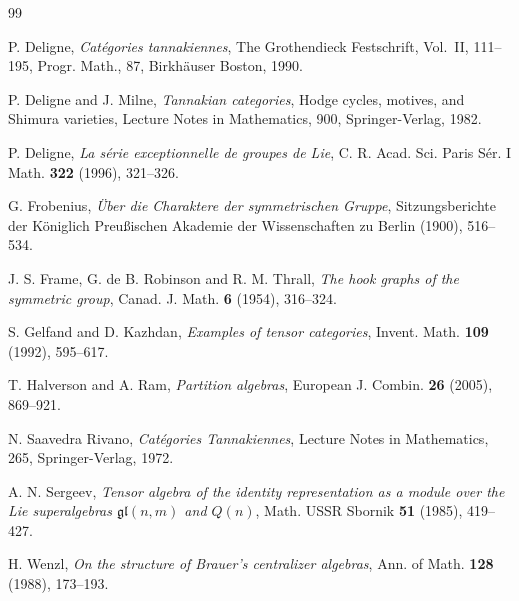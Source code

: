 \documentclass[11pt,a4paper]{article}
\theoremstyle{plain}
\theoremstyle{definition}
\begin{document}
\begin{thebibliography}{99}

P. Deligne, \textit{Cat\'egories tannakiennes}, The Grothendieck Festschrift, Vol.~II, 111--195, Progr. Math., 87, Birkh{\"a}user Boston, 1990.

P. Deligne and J. Milne, \textit{Tannakian categories}, Hodge cycles, motives, and Shimura varieties, Lecture Notes in Mathematics, 900, Springer-Verlag, 1982.

P. Deligne, \textit{La s\'erie exceptionnelle de groupes de Lie}, C. R. Acad. Sci. Paris S\'er. I Math. \textbf{322} (1996), 321--326.

G. Frobenius, \textit{\"Uber die Charaktere der symmetrischen Gruppe}, Sitzungsberichte der K\"oniglich Preu{\ss}ischen Akademie der Wissenschaften zu Berlin (1900), 516--534.

J. S. Frame, G. de B. Robinson and R. M. Thrall, \textit{The hook graphs of the symmetric group}, Canad. J. Math. \textbf{6} (1954), 316--324.

S. Gelfand and D. Kazhdan, \textit{Examples of tensor categories}, Invent. Math. \textbf{109} (1992), 595--617.

T. Halverson and A. Ram, \textit{Partition algebras}, European J. Combin. \textbf{26} (2005), 869--921.

N. Saavedra Rivano, \textit{Cat\'egories Tannakiennes}, Lecture Notes in Mathematics, 265, Springer-Verlag, 1972.

A. N. Sergeev, \textit{Tensor algebra of the identity representation as a module over the Lie superalgebras $\mathfrak{gl}(n,m)$ and $Q(n)$}, Math. USSR Sbornik \textbf{51} (1985), 419--427.

H. Wenzl, \textit{On the structure of Brauer's centralizer algebras}, Ann. of Math. \textbf{128} (1988), 173--193.

\end{thebibliography}
\end{document}
